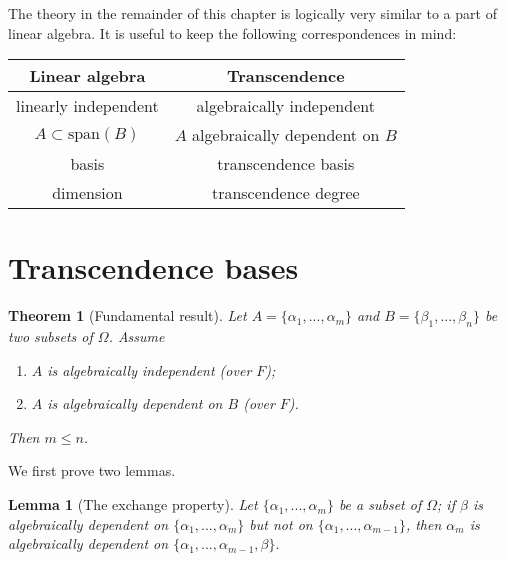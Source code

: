 \documentclass[a4paper,11pt,final,openany]{memoir}
\newtheorem{lemma}[X]{Lemma}
\newtheorem{theorem}[X]{Theorem}
\theoremstyle{nonumberplain}
\begin{document}
The theory in the remainder of this chapter is logically very similar to a
part of linear algebra. It is useful to keep the following correspondences in
mind:\hfill

\begin{center}\small
\begin{tabular}
[c]{|c|c|}\hline
Linear algebra & Transcendence\\\hline
linearly independent & algebraically independent\\\hline
$A\subset\text{span}(B)$ & $A$ algebraically dependent on $B$\\\hline
basis & transcendence basis\\\hline
dimension & transcendence degree\\\hline
\end{tabular}



\end{center}

\section{Transcendence bases}

\begin{theorem}
[Fundamental result]\label{te3} Let $A=\{\alpha_{1},...,\alpha_{m}\}$ and
$B=\{\beta_{1},...,\beta_{n}\}$ be two subsets of $\Omega$. Assume

\begin{enumerate}
\item $A$ is algebraically independent (over $F$);

\item $A$ is algebraically dependent on $B$ (over $F$).
\end{enumerate}

\noindent Then $m\leq n$.
\end{theorem}

We first prove two lemmas.

\begin{lemma}
[The exchange property]\label{te4}Let $\{\alpha_{1},...,\alpha_{m}\}$ be a
subset of $\Omega$; if $\beta$ is algebraically dependent on $\{\alpha
_{1},...,\alpha_{m}\}$ but not on $\{\alpha_{1},...,\alpha_{m-1}\}$, then
$\alpha_{m}$ is algebraically dependent on $\{\alpha_{1},...,\alpha
_{m-1},\beta\}.$
\end{lemma}
\end{document}
